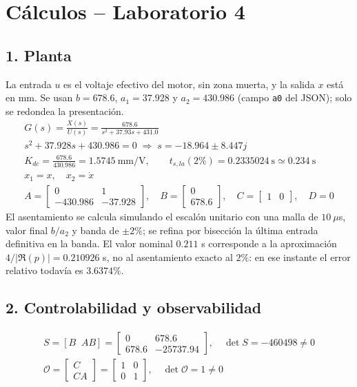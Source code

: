 \documentclass[11pt]{article}
\begin{document}
\section*{Cálculos -- Laboratorio 4}

\subsection*{1. Planta}
La entrada $u$ es el voltaje efectivo del motor, sin zona muerta, y la salida $x$ está en mm. Se usan $b=678.6$, $a_1=37.928$ y $a_2=430.986$ (campo \texttt{a0} del JSON); solo se redondea la presentación.
\begin{gather*}
G(s)=\frac{X(s)}{U(s)}=\frac{678.6}{s^2+37.93s+431.0}\\
s^2+37.928s+430.986=0\;\Rightarrow\;s=-18.964\pm 8.447j\\
K_{dc}=\frac{678.6}{430.986}=1.5745~\text{mm/V},\qquad t_{s,la}(2\%)=0.2335024~\text{s}\simeq 0.234~\text{s}\\
x_1=x,\quad x_2=\dot x\\
A=\begin{bmatrix}0 & 1 \\ -430.986 & -37.928\end{bmatrix},\quad B=\begin{bmatrix}0 \\ 678.6\end{bmatrix},\quad C=\begin{bmatrix}1 & 0\end{bmatrix},\quad D=0
\end{gather*}
El asentamiento se calcula simulando el escalón unitario con una malla de $10~\mu$s, valor final $b/a_2$ y banda de $\pm2\%$; se refina por bisección la última entrada definitiva en la banda.
El valor nominal $0.211$ s corresponde a la aproximación $4/|\Re(p)|=0.210926$ s, no al asentamiento exacto al $2\%$: en ese instante el error relativo todavía es $3.6374\%$.
\subsection*{2. Controlabilidad y observabilidad}
\begin{gather*}
S=[B\;\;AB]=\begin{bmatrix}0 & 678.6 \\ 678.6 & -25737.94\end{bmatrix},\quad\det S=-460498\ne0\\
\mathcal O=\begin{bmatrix}C\\CA\end{bmatrix}=\begin{bmatrix}1 & 0 \\ 0 & 1\end{bmatrix},\quad\det\mathcal O=1\ne0
\end{gather*}
\end{document}

